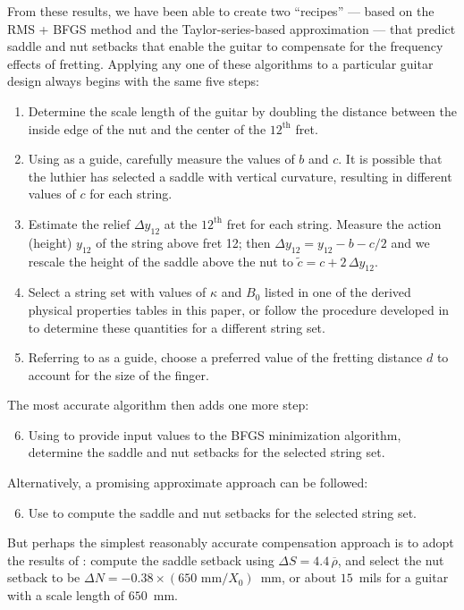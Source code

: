 From these results, we have been able to create two ``recipes'' --- based on the RMS + BFGS method and the Taylor-series-based approximation --- that predict saddle and nut setbacks that enable the guitar to compensate for the frequency effects of fretting. Applying any one of these algorithms to a particular guitar design always begins with the same five steps:
\begin{enumerate}
    \item Determine the scale length of the guitar by doubling the distance between the inside edge of the nut and the center of the $12^\textrm{th}$ fret. 
    \item Using  as a guide, carefully measure the values of $b$ and $c$. It is possible that the luthier has selected a saddle with vertical curvature, resulting in different values of $c$ for each string.
    \item Estimate the relief $\Delta y_{12}$ at the $12^\textrm{th}$ fret for each string. Measure the action (height) $y_{12}$ of the string above fret 12; then $\Delta y_{12} = y_{12} - b - c/2$ and we rescale the height of the saddle above the nut to $\tilde{c} = c + 2\, \Delta y_{12}$.
    \item Select a string set with values of $\kappa$ and $B_0$ listed in one of the derived physical properties tables in this paper, or follow the procedure developed in  to determine these quantities for a different string set.
    \item Referring to  as a guide, choose a preferred value of the fretting distance $d$ to account for the size of the finger.
\end{enumerate}
The most accurate algorithm then adds one more step:
\begin{enumerate}
    \setcounter{enumi}{5}
    \item Using  to provide input values to the BFGS minimization algorithm, determine the saddle and nut setbacks for the selected string set.
\end{enumerate}
Alternatively, a promising approximate approach can be followed:
\begin{enumerate}
    \setcounter{enumi}{5}
    \item Use  to compute the saddle and nut setbacks for the selected string set.
\end{enumerate}
But perhaps the simplest reasonably accurate compensation approach is to adopt the results of : compute the saddle setback using $\Delta S = 4.4\, \overline{\rho}$, and select the nut setback to be $\Delta N = -0.38 \times (650 \textrm{ mm} / X_0)$~mm, or about $15$~mils for a guitar with a scale length of $650$~mm.

